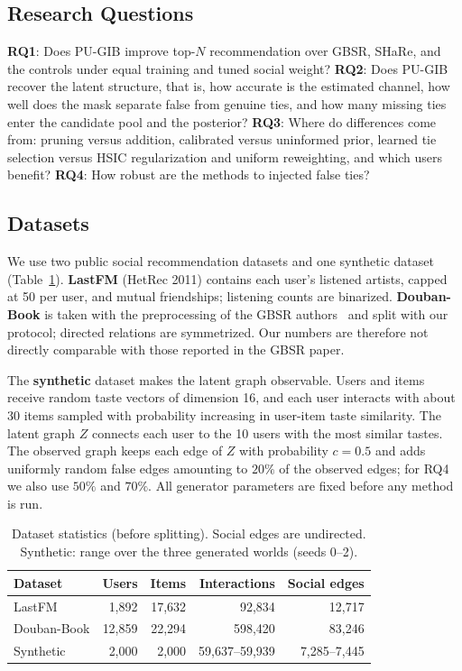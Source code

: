\documentclass[sigconf]{acmart}
\begin{document}
\subsection{Research Questions}
\textbf{RQ1}: Does PU-GIB improve top-$N$ recommendation over GBSR, SHaRe, and the controls under equal training and tuned social weight? \textbf{RQ2}: Does PU-GIB recover the latent structure, that is, how accurate is the estimated channel, how well does the mask separate false from genuine ties, and how many missing ties enter the candidate pool and the posterior? \textbf{RQ3}: Where do differences come from: pruning versus addition, calibrated versus uninformed prior, learned tie selection versus HSIC regularization and uniform reweighting, and which users benefit? \textbf{RQ4}: How robust are the methods to injected false ties?

\subsection{Datasets}
We use two public social recommendation datasets and one synthetic dataset (Table~\ref{tab:data}). \textbf{LastFM} (HetRec 2011) contains each user's listened artists, capped at 50 per user, and mutual friendships; listening counts are binarized. \textbf{Douban-Book} is taken with the preprocessing of the GBSR authors~\cite{10.1145/3637528.3671807} and split with our protocol; directed relations are symmetrized. Our numbers are therefore not directly comparable with those reported in the GBSR paper.

The \textbf{synthetic} dataset makes the latent graph observable. Users and items receive random taste vectors of dimension 16, and each user interacts with about 30 items sampled with probability increasing in user-item taste similarity. The latent graph $Z$ connects each user to the 10 users with the most similar tastes. The observed graph keeps each edge of $Z$ with probability $c = 0.5$ and adds uniformly random false edges amounting to $20\%$ of the observed edges; for RQ4 we also use $50\%$ and $70\%$. All generator parameters are fixed before any method is run.

\begin{table}[t]
\caption{Dataset statistics (before splitting). Social edges are undirected. Synthetic: range over the three generated worlds (seeds 0--2).}
\label{tab:data}
\small
\setlength{\tabcolsep}{4pt}
\begin{tabular}{@{}lrrrr@{}}
\toprule
Dataset & Users & Items & Interactions & Social edges \\
\midrule
LastFM & 1,892 & 17,632 & 92,834 & 12,717 \\
Douban-Book & 12,859 & 22,294 & 598,420 & 83,246 \\
Synthetic & 2,000 & 2,000 & 59,637--59,939 & 7,285--7,445 \\
\bottomrule
\end{tabular}
\end{table}
\end{document}
